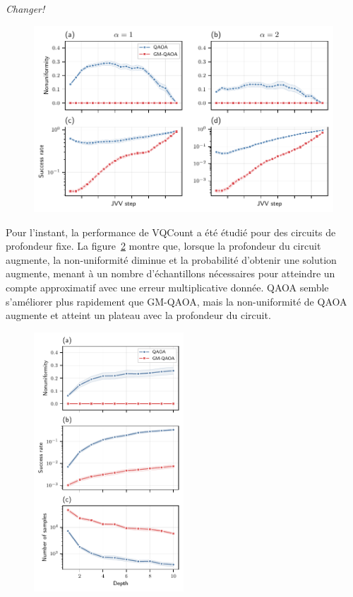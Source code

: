\textcolor{mydarkred}{\textit{Changer!}}

\begin{figure}[h!]
    \centering
    \includegraphics[width=1\textwidth]{figures/nae3sat-jvv-steps}
    \caption[Impact de la procédure d'auto-réduction sur la non-uniformité pour \#NAE3SAT]{}
    \label{fig:nae3sat-jvv-steps}
\end{figure}

Pour l'instant, la performance de VQCount a été étudié pour des circuits de profondeur fixe. La figure~\ref{fig:nae3sat-depth} montre que, lorsque la profondeur du circuit augmente, la non-uniformité diminue et la probabilité d'obtenir une solution augmente, menant à un nombre d'échantillons nécessaires pour atteindre un compte approximatif avec une erreur multiplicative donnée. QAOA semble s'améliorer plus rapidement que GM-QAOA, mais la non-uniformité de QAOA augmente et atteint un plateau avec la profondeur du circuit.

\begin{figure}[h!]
    \centering
    \includegraphics[width=0.5\textwidth]{figures/nae3sat-depth.pdf}
    \caption[]{}
    \label{fig:nae3sat-depth}
\end{figure}

